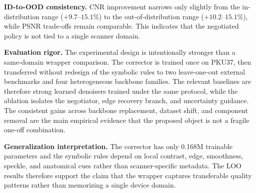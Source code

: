 \documentclass{ieeetj}
\begin{document}
\textbf{ID-to-OOD consistency.} CNR improvement narrows only slightly from the in-distribution range ($+9.7$--$15.1\%$) to the out-of-distribution range ($+10.2$--$15.1\%$), while PSNR trade-offs remain comparable. This indicates that the negotiated policy is not tied to a single scanner domain.

\textbf{Evaluation rigor.} The experimental design is intentionally stronger than a same-domain wrapper comparison. The corrector is trained once on PKU37, then transferred without redesign of the symbolic rules to two leave-one-out external benchmarks and four heterogeneous backbone families. The relevant baselines are therefore strong learned denoisers trained under the same protocol, while the ablation isolates the negotiator, edge recovery branch, and uncertainty guidance. The consistent gains across backbone replacement, dataset shift, and component removal are the main empirical evidence that the proposed object is not a fragile one-off combination.

\textbf{Generalization interpretation.} The corrector has only 0.168M trainable parameters and the symbolic rules depend on local contrast, edge, smoothness, speckle, and anatomical cues rather than scanner-specific metadata. The LOO results therefore support the claim that the wrapper captures transferable quality patterns rather than memorizing a single device domain.
\end{document}
